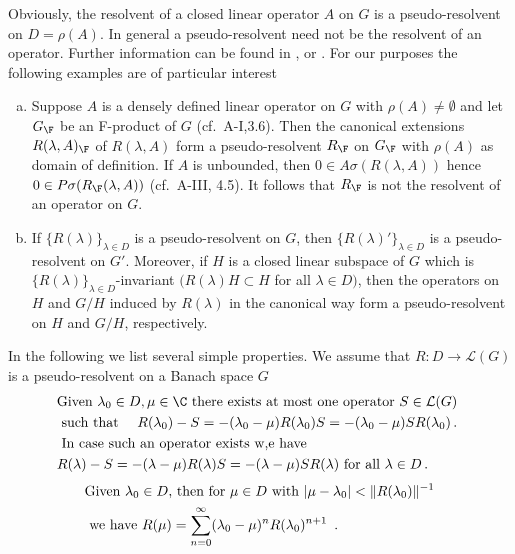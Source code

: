 Obviously, the resolvent of a closed linear operator $A$ on $G$ is a pseudo-resolvent on $D = \rho(A)$.
In general a pseudo-resolvent need not be the resolvent of an operator.
Further information can be found in \citet{hillephillips:1957}, \citet{pazy:1983} or \citet{yosida:1974}.
For our purposes the following examples are of particular interest

\begin{example}\label{ex:c3-2.5}
	\begin{enumerate}[(a), wide]
		\item 
		Suppose $A$ is a densely defined linear operator on $G$ with $\rho(A) \neq \emptyset$ and let $G_{\F}$ be an F-product of $G$ (cf.\ A-I,3.6).
		Then the canonical extensions $R(\lambda,A)_{\F}$ of $R(\lambda,A)$ form a pseudo-resolvent $R_{\F}$ on $G_{\F}$ with $\rho(A)$ as domain of definition.
		If $A$ is unbounded, then $0 \in A\sigma(R(\lambda,A))$ hence $0 \in P\sigma(R_{\F}(\lambda,A))$ (cf.\ A-III, 4.5).
		It follows that $R_{\F}$ is not the resolvent of an operator on $G$.
		
		\item 
		If $\{R(\lambda)\}_{\lambda\in D}$ is a pseudo-resolvent on $G$, then $\{R(\lambda)'\}_{\lambda\in D}$ is a pseudo-resolvent on $G'$.
		Moreover, if $H$ is a closed linear subspace of $G$ which is $\{R(\lambda)\}_{\lambda\in D}$-invariant $(R(\lambda)H \subset H$ for all $\lambda \in D)$, then the operators on $H$ and $G/H$ induced by $R(\lambda)$ in the canonical way form a pseudo-resolvent on $H$ and $G/H$, respectively.
	\end{enumerate}
\end{example}

In the following we list several simple properties.
We assume that $R \colon D \to \mathcal{L}(G)$ is a pseudo-resolvent on a Banach space $G$
\begin{equation}\label{eq:c3-2.10}
	\begin{aligned}
	&\text{Given  $\lambda_{0} \in D, \mu \in \C $  there exists at most one operator  $S \in \mathcal{L}(G)$ }\\
	&\text{ such that \quad $R(\lambda_{0}) - S = -(\lambda_{0}-\mu)R(\lambda_{0})S = -(\lambda_{0}-\mu)SR(\lambda_{0})$}\,.\\
	&\text{ In case such an operator exists w,e have} \\
	&\text{$R(\lambda) - S = -(\lambda-\mu)R(\lambda)S = -(\lambda-\mu)SR(\lambda)$ for all $\lambda \in D$}\,.
	\end{aligned}
\end{equation}
%
\begin{equation}\label{eq:c3-2.11}
	\begin{aligned}
	&\text{Given  $\lambda_{0} \in D$,  then for  $\mu \in D$  with  $|\mu-\lambda_{0}| < \|R(\lambda_{0})\|^{-1}$}\\ 
	&\text{ we have $ R(\mu) = \sum_{n=0}^{\infty} (\lambda_{0}-\mu)^n R(\lambda_{0})^{n+1}$ }\,.
	\end{aligned}
\end{equation}

